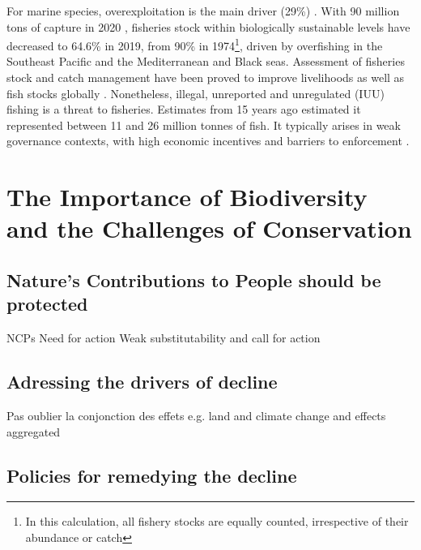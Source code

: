 For marine species, overexploitation is the main driver (29\%) \citep{ipbes_2022_6417333}. With 90 million tons of capture 
in 2020 \citep{fao_2022_state}, fisheries stock within biologically sustainable levels have decreased to 64.6\% in 2019, from 90\% in 1974\footnote{ In this calculation, all fishery stocks are equally counted, irrespective of their abundance or catch}, driven by overfishing in the Southeast Pacific and the Mediterranean and Black seas. Assessment of fisheries stock and catch management have been proved to improve livelihoods as well as fish stocks globally \citep{melnychuk_2017_fisheries, hilborn_2020_effective}. Nonetheless, illegal, unreported and unregulated (IUU) fishing is a threat to fisheries. Estimates from 15 years ago \citep{agnew_estimating_2009} estimated it represented between 11 and 26 million tonnes of fish.
It typically arises in weak governance contexts, with high economic incentives and barriers to enforcement \citep{iuu_2020_widjaja}. 


\section*{The Importance of Biodiversity and the Challenges of Conservation}



\subsection*{Nature's Contributions to People should be protected}



NCPs
Need for action
Weak substitutability and call for action

\subsection*{Adressing the drivers of decline}
Pas oublier la conjonction des effets e.g. land and climate change and effects aggregated
\subsection*{Policies for remedying the decline}



